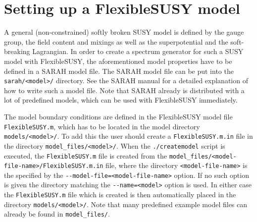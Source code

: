 \documentclass[final,3p,11pt,pdflatex]{elsarticle}
\makeatletter
\newcommand{\fs}{FlexibleSUSY\@\xspace}
\newcommand{\code}[1]{\lstinline|#1|}  %
\makeatother
\begin{document}
\section{Setting up a FlexibleSUSY model}
\label{sec:modfile}

A general (non-constrained) softly broken SUSY model is defined by the
gauge group, the field content and mixings as well as the
superpotential and the soft-breaking Lagrangian.  In order to create a
spectrum generator for such a SUSY model with \fs, the aforementioned
model properties have to be defined in a SARAH model file.  The SARAH
model file can be put into the \code{sarah/<model>/} directory.  See
the SARAH manual \cite{Staub:2008uz,Staub:2013tta} for a detailed
explanation of how to write such a model file.  Note that SARAH
already is distributed with a lot of predefined models, which can be used with
\fs immediately.

The model boundary conditions are defined in the \fs model file
\code{FlexibleSUSY.m}, which has to be located in the model directory
\code{models/<model>/}.  To add this the user should create a
\code{FlexibleSUSY.m.in} file in the directory
\code{model_files/<model>/}.  When the \code{./createmodel} script is
executed, the \code{FlexibleSUSY.m} file is created from the
\code{model_files/<model-file-name>/FlexibleSUSY.m.in} file, where the
directory \code{<model-file-name>} is the specified by the
\code{--model-file=<model-file-name>} option.  If no such option is
given the directory matching the \code{--name=<model>} option is used.
In either case the \code{FlexibleSUSY.m} file which is created is then
automatically placed in the directory \code{models/<model>/}.  Note
that many predefined example model files can already be found in
\code{model_files/}.
\end{document}
